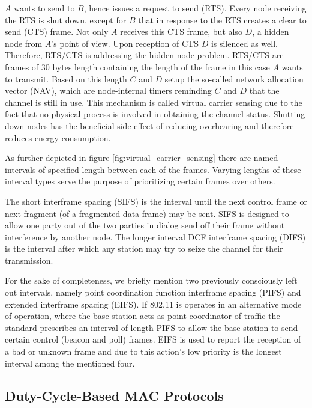 $A$ wants to send to $B$, hence issues a request to send (RTS). Every node receiving the RTS is shut down, except for $B$ that in response to the RTS creates a clear to send (CTS) frame. Not only $A$ receives this CTS frame, but also $D$, a hidden node from $A$'s point of view. Upon reception of CTS $D$ is silenced as well. Therefore, RTS/CTS is addressing the hidden node problem. RTS/CTS are frames of 30 bytes length containing the length of the frame in this case $A$ wants to transmit. Based on this length $C$ and $D$ setup the so-called network allocation vector (NAV), which are node-internal timers reminding $C$ and $D$ that the channel is still in use. This mechanism is called virtual carrier sensing due to the fact that no physical process is involved in obtaining the channel status. Shutting down nodes has the beneficial side-effect of reducing overhearing and therefore reduces energy consumption.

As further depicted in figure \ref{fig:virtual_carrier_sensing} there are named intervals of specified length between each of the frames. Varying lengths of these interval types serve the purpose of prioritizing certain frames over others. 

The short interframe spacing (SIFS) is the interval until the next control frame or next fragment (of a fragmented data frame) may be sent. SIFS is designed to allow one party out of the two parties in dialog send off their frame without interference by another node. The longer interval DCF interframe spacing (DIFS) is the interval after which any station may try to seize the channel for their transmission.

For the sake of completeness, we briefly mention two previously consciously left out intervals, namely point coordination function interframe spacing (PIFS) and extended interframe spacing (EIFS). If 802.11 is operates in an alternative mode of operation, where the base station acts as point coordinator of traffic the standard prescribes an interval of length PIFS to allow the base station to send certain control (beacon and poll) frames. EIFS is used to report the reception of a bad or unknown frame and due to this action's low priority is the longest interval among the mentioned four. 

\subsection{Duty-Cycle-Based MAC Protocols} \label{sec:duty-cycle-mac}  

